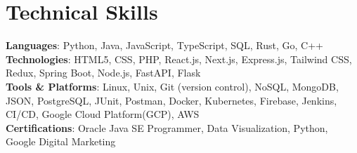 \section{Technical Skills}
    \begin{itemize}[leftmargin=0.05in, label={}]
	\small{\item{
		\textbf{Languages}{: Python, Java, JavaScript, TypeScript, SQL, Rust, Go, C++ } \\
		\textbf{Technologies}{: HTML5, CSS, PHP, React.js, Next.js, Express.js, Tailwind CSS, Redux, Spring Boot, Node.js, FastAPI, Flask} \\
		\textbf{Tools \& Platforms}{: Linux, Unix, Git (version control), NoSQL, MongoDB, JSON, PostgreSQL, JUnit, Postman, Docker, Kubernetes, Firebase, Jenkins, CI/CD, Google Cloud Platform(GCP), AWS} \\
		\textbf{Certifications}{: Oracle Java SE Programmer, Data Visualization, Python, Google Digital Marketing}
	}}
    \end{itemize}